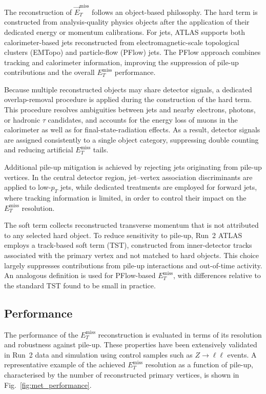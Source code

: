 The reconstruction of $\vec{E}^{\mathrm{miss}}_T$ follows an object-based
philosophy.
The hard term is constructed from analysis-quality physics objects after the
application of their dedicated energy or momentum calibrations.
For jets, ATLAS supports both calorimeter-based jets reconstructed from
electromagnetic-scale topological clusters (EMTopo) and particle-flow (PFlow)
jets.
The PFlow approach combines tracking and calorimeter information, improving the
suppression of pile-up contributions and the overall $E^{\mathrm{miss}}_T$
performance.

Because multiple reconstructed objects may share detector signals, a dedicated
overlap-removal procedure is applied during the construction of the hard term.
This procedure resolves ambiguities between jets and nearby electrons, photons,
or hadronic $\tau$ candidates, and accounts for the energy loss of muons in the
calorimeter as well as for final-state-radiation effects.
As a result, detector signals are assigned consistently to a single object
category, suppressing double counting and reducing artificial
$E^{\mathrm{miss}}_T$ tails.

Additional pile-up mitigation is achieved by rejecting jets originating from
pile-up vertices.
In the central detector region, jet--vertex association discriminants are applied
to low-$p_T$ jets, while dedicated treatments are employed for forward jets,
where tracking information is limited, in order to control their impact on the
$E^{\mathrm{miss}}_T$ resolution.

The soft term collects reconstructed transverse momentum that is not attributed
to any selected hard object.
To reduce sensitivity to pile-up, Run~2 ATLAS employs a track-based soft term
(TST), constructed from inner-detector tracks associated with the primary vertex
and not matched to hard objects.
This choice largely suppresses contributions from pile-up interactions and
out-of-time activity.
An analogous definition is used for PFlow-based $E^{\mathrm{miss}}_T$, with
differences relative to the standard TST found to be small in practice.

\subsection{Performance}

The performance of the $E^{\mathrm{miss}}_T$ reconstruction is evaluated in terms
of its resolution and robustness against pile-up.
These properties have been extensively validated in Run~2 data and simulation
using control samples such as $Z\to\ell\ell$ events.
A representative example of the achieved $E^{\mathrm{miss}}_T$ resolution as a
function of pile-up, characterised by the number of reconstructed primary
vertices, is shown in Fig.~\ref{fig:met_performance}.

